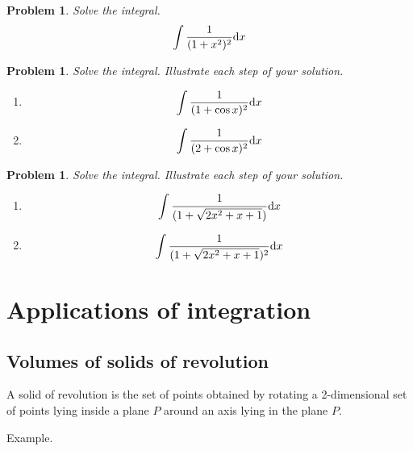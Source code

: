 \documentclass[12pt]{book}
\newtheorem{problem}[theorem]{Problem}
\begin{document}
\begin{problem}
Solve the integral.
\[
\int \frac{1}{(1+x^2)^2}{\normalfont \text{d}} x
\]
\end{problem}

\begin{problem}
Solve the integral. Illustrate each step of your solution.
\begin{enumerate}
\item
\[
\int \frac{1}{(1 + \cos x)^2}{\normalfont \text{d}} x
\]
\item
\[
\int \frac{1}{(2+\cos x)^2}{\normalfont \text{d}} x
\]
\end{enumerate}
\end{problem}
\begin{problem}
Solve the integral. Illustrate each step of your solution.
\begin{enumerate}
\item
\[
\int \frac{1}{(1 + \sqrt{2x^2+x+1})}{\normalfont \text{d}} x
\]
\item
\[
\int \frac{1}{(1 + \sqrt{2x^2+x+1})^2}{\normalfont \text{d}} x
\]
\end{enumerate}
\end{problem}
\chapter{Applications of integration}
\section{Volumes of solids of revolution}
A solid of revolution is the set of points obtained by rotating a 2-dimensional set of points lying inside a plane $P$ around an axis lying in the plane $P$.

Example. \label{itemExampleFigureRotationalSolid}

\end{document}
